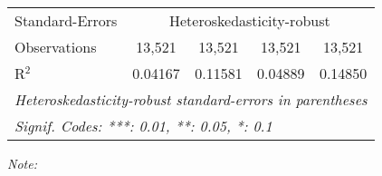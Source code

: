 \begin{table}[htbp!]
\begin{adjustbox}{width = 1\textwidth, max height = 0.95\textheight, center}
\begin{threeparttable}[b]
\begin{tabular}{lcccc}
            \midrule 
            Standard-Errors & \multicolumn{4}{c}{Heteroskedasticity-robust} \\ 
            Observations         & 13,521                         & 13,521                         & 13,521                         & 13,521\\  
            R$^2$                & 0.04167                        & 0.11581                        & 0.04889                        & 0.14850\\  
            \midrule \midrule
            \multicolumn{5}{l}{\emph{Heteroskedasticity-robust standard-errors in parentheses}}\\
            \multicolumn{5}{l}{\emph{Signif. Codes: ***: 0.01, **: 0.05, *: 0.1}}\\
         \end{tabular}
         
         \begin{tablenotes}\item \medskip \textit{Note:}
         \end{tablenotes}
      \end{threeparttable}
   \end{adjustbox}
\end{table}


